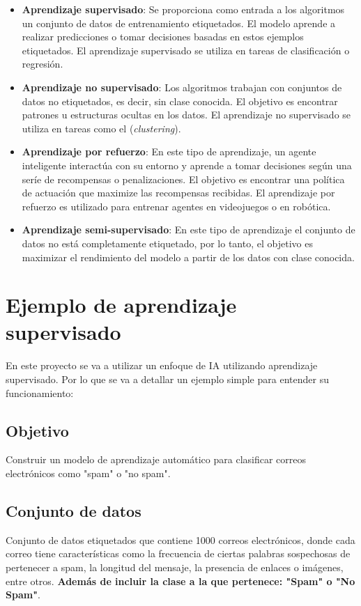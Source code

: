 \begin{itemize}
\item \textbf{Aprendizaje supervisado}: Se proporciona como entrada a los algoritmos un conjunto de datos de entrenamiento etiquetados. El modelo aprende a realizar predicciones o tomar decisiones basadas en estos ejemplos etiquetados. El aprendizaje supervisado se utiliza en tareas de clasificación o regresión.

\item \textbf{Aprendizaje no supervisado}: Los algoritmos trabajan con conjuntos de datos no etiquetados, es decir, sin clase conocida. El objetivo es encontrar patrones u estructuras ocultas en los datos. El aprendizaje no supervisado se utiliza en tareas como el (\textit{clustering}).

\item \textbf{Aprendizaje por refuerzo}: En este tipo de aprendizaje, un agente inteligente interactúa con su entorno y aprende a tomar decisiones según una seríe de recompensas o penalizaciones. El objetivo es encontrar una política de actuación que maximize las recompensas recibidas. El aprendizaje por refuerzo es utilizado para entrenar agentes en videojuegos o en robótica.

\item \textbf{Aprendizaje semi-supervisado}: En este tipo de aprendizaje el conjunto de datos no está completamente etiquetado, por lo tanto, el objetivo es maximizar el rendimiento del modelo a partir de los datos con clase conocida.
\end{itemize}

\section{Ejemplo de aprendizaje supervisado}

En este proyecto se va a utilizar un enfoque de IA utilizando aprendizaje supervisado. Por lo que se va a detallar un ejemplo simple para entender su funcionamiento:

\subsection{Objetivo}
Construir un modelo de aprendizaje automático para clasificar correos electrónicos como "spam" o "no spam".

\subsection{Conjunto de datos}
Conjunto de datos etiquetados que contiene 1000 correos electrónicos, donde cada correo tiene características como la frecuencia de ciertas palabras sospechosas de pertenecer a spam, la longitud del mensaje, la presencia de enlaces o imágenes, entre otros. \textbf{Además de incluir la clase a la que pertenece: "Spam" o "No Spam"}.


